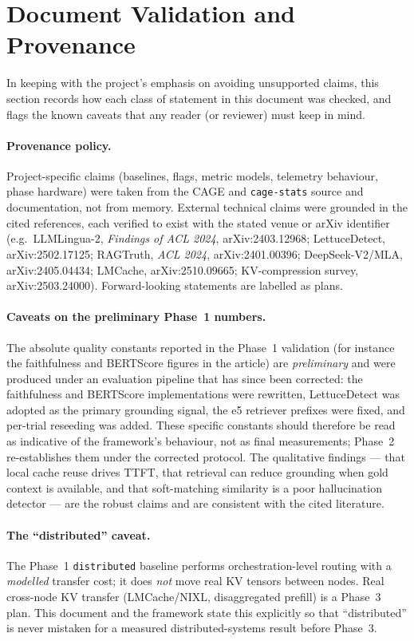 \documentclass[12pt,a4paper]{article}
\begin{document}
\section{Document Validation and Provenance}
\label{sec:validation}

In keeping with the project's emphasis on avoiding unsupported claims, this section
records how each class of statement in this document was checked, and flags the
known caveats that any reader (or reviewer) must keep in mind.

\paragraph{Provenance policy.} Project-specific claims (baselines, flags, metric
models, telemetry behaviour, phase hardware) were taken from the CAGE and
\texttt{cage-stats} source and documentation, not from memory. External technical
claims were grounded in the cited references, each verified to exist with the
stated venue or arXiv identifier (e.g.\ LLMLingua-2, \emph{Findings of ACL 2024},
arXiv:2403.12968; LettuceDetect, arXiv:2502.17125; RAGTruth, \emph{ACL 2024},
arXiv:2401.00396; DeepSeek-V2/MLA, arXiv:2405.04434; LMCache, arXiv:2510.09665;
KV-compression survey, arXiv:2503.24000). Forward-looking statements are labelled
as plans.

\paragraph{Caveats on the preliminary Phase~1 numbers.} The absolute quality
constants reported in the Phase~1 validation (for instance the faithfulness and
BERTScore figures in the article) are \emph{preliminary} and were produced under an
evaluation pipeline that has since been corrected: the faithfulness and BERTScore
implementations were rewritten, LettuceDetect was adopted as the primary grounding
signal, the e5 retriever prefixes were fixed, and per-trial reseeding was added.
These specific constants should therefore be read as indicative of the framework's
behaviour, not as final measurements; Phase~2 re-establishes them under the
corrected protocol. The qualitative findings --- that local cache reuse drives
TTFT, that retrieval can reduce grounding when gold context is available, and that
soft-matching similarity is a poor hallucination detector --- are the robust claims
and are consistent with the cited literature.

\paragraph{The ``distributed'' caveat.} The Phase~1 \texttt{distributed} baseline
performs orchestration-level routing with a \emph{modelled} transfer cost; it does
\emph{not} move real KV tensors between nodes. Real cross-node KV transfer
(LMCache/NIXL, disaggregated prefill) is a Phase~3 plan. This document and the
framework state this explicitly so that ``distributed'' is never mistaken for a
measured distributed-systems result before Phase~3.
\end{document}
